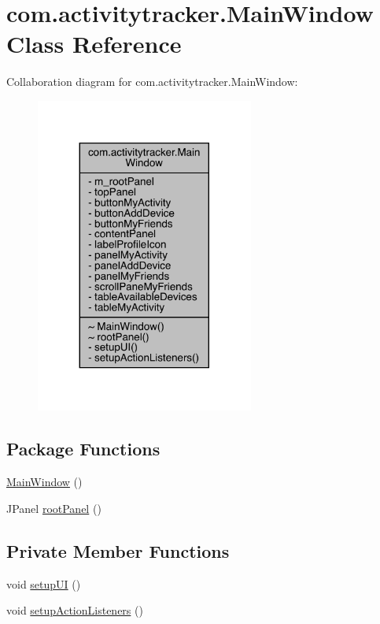 \hypertarget{classcom_1_1activitytracker_1_1_main_window}{}\section{com.\+activitytracker.\+Main\+Window Class Reference}
\label{classcom_1_1activitytracker_1_1_main_window}


Collaboration diagram for com.\+activitytracker.\+Main\+Window\+:
\nopagebreak
\begin{figure}[H]
\begin{center}
\leavevmode
\includegraphics[width=203pt]{classcom_1_1activitytracker_1_1_main_window__coll__graph}
\end{center}
\end{figure}
\subsection*{Package Functions}
\begin{DoxyCompactItemize}
\item 
\mbox{\hyperlink{classcom_1_1activitytracker_1_1_main_window_a77d0ebef154786202a165f496dc70065}{Main\+Window}} ()
\item 
J\+Panel \mbox{\hyperlink{classcom_1_1activitytracker_1_1_main_window_a62e9c6f477ccc5b93aff33abb567fde4}{root\+Panel}} ()
\end{DoxyCompactItemize}
\subsection*{Private Member Functions}
\begin{DoxyCompactItemize}
\item 
void \mbox{\hyperlink{classcom_1_1activitytracker_1_1_main_window_a53a019623a37b950473359fc625b6423}{setup\+UI}} ()
\item 
void \mbox{\hyperlink{classcom_1_1activitytracker_1_1_main_window_a76b3e8567b228ccd26f09c15ebaddb72}{setup\+Action\+Listeners}} ()
\end{DoxyCompactItemize}
